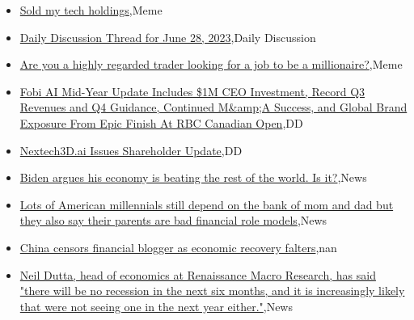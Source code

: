 \documentclass{article}%
\begin{document}
%
\begin{itemize}%
\item%
\href{https://reddit.com/r/wallstreetbets/comments/14l6dyz/sold\_my\_tech\_holdings/}{Sold my tech holdings},Meme%
\item%
\href{https://reddit.com/r/wallstreetbets/comments/14l5bqq/daily\_discussion\_thread\_for\_june\_28\_2023/}{Daily Discussion Thread for June 28, 2023},Daily Discussion%
\item%
\href{https://reddit.com/r/wallstreetbets/comments/14kwotn/are\_you\_a\_highly\_regarded\_trader\_looking\_for\_a/}{Are you a highly regarded trader looking for a job to be a millionaire?},Meme%
\item%
\href{https://reddit.com/r/Baystreetbets/comments/14khgpv/fobi\_ai\_midyear\_update\_includes\_1m\_ceo\_investment/}{Fobi AI Mid-Year Update Includes \$1M CEO Investment, Record Q3 Revenues and Q4 Guidance, Continued M\&amp;A Success, and Global Brand Exposure From Epic Finish At RBC Canadian Open},DD%
\item%
\href{https://reddit.com/r/Baystreetbets/comments/14kdxxi/nextech3dai\_issues\_shareholder\_update/}{Nextech3D.ai Issues Shareholder Update},DD%
\item%
\href{https://reddit.com/r/Economics/comments/14l6y2s/biden\_argues\_his\_economy\_is\_beating\_the\_rest\_of/}{Biden argues his economy is beating the rest of the world. Is it?},News%
\item%
\href{https://reddit.com/r/Economics/comments/14l2vkb/lots\_of\_american\_millennials\_still\_depend\_on\_the/}{Lots of American millennials still depend on the bank of mom and dad  but they also say their parents are bad financial role models},News%
\item%
\href{https://reddit.com/r/Economics/comments/14kmc48/china\_censors\_financial\_blogger\_as\_economic/}{China censors financial blogger as economic recovery falters},nan%
\item%
\href{https://reddit.com/r/Economics/comments/14kdfws/neil\_dutta\_head\_of\_economics\_at\_renaissance\_macro/}{Neil Dutta, head of economics at Renaissance Macro Research, has said "there will be no recession in the next six months, and it is increasingly likely that were not seeing one in the next year either."},News%
\end{itemize}%
\end{document}
